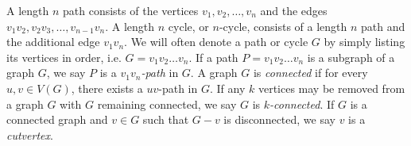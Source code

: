 \documentclass[letterpaper, 12pt]{amsart}
\theoremstyle{definition}
\theoremstyle{definition}
\theoremstyle{thm}
\theoremstyle{definition}
\begin{document}
A length $n$ path consists of the vertices $v_1,v_2,\ldots,v_n$ and the edges
$v_1v_2,v_2v_3,\ldots,v_{n-1}v_n$. A length $n$ cycle, or $n$-cycle, consists of
a length $n$ path and the additional edge $v_1v_n$. We will often denote a path
or cycle $G$ by simply listing its vertices in order, i.e. $G=v_1v_2\ldots v_n$.
If a path $P=v_1v_2\ldots v_n$ is a subgraph of a graph $G$, we say $P$ is a
\textit{$v_1v_n$-path} in $G$. A graph $G$ is \textit{connected} if for every
$u,v\in V(G)$, there exists a $uv$-path in $G$. If any $k$ vertices may be
removed from a graph $G$ with $G$ remaining connected, we say $G$ is
\textit{$k$-connected}. If $G$ is a connected graph and $v\in G$ such that $G-v$
is disconnected, we say $v$ is a \textit{cutvertex}.

\begin{comment}
\begin{figure}
\begin{tikzpicture}
	\node (a) at (0cm,0.75cm) {};
	\node (b) at (0.866cm,-0.75cm) {};
	\node (c) at (-0.866cm,-0.75cm) {};
	\node [draw=none, fill=none] (1) at (0cm,-1cm) {};
	\node [draw=none, fill=none] (2) at (0cm,1cm) {};
	\draw (a) -- (b) -- (c) -- (a);
\end{tikzpicture}
$\qquad$
\begin{tikzpicture}
	\node (a) at (0.75cm,0.75cm) {};
	\node (b) at (0.75cm,-0.75cm) {};
	\node (c) at (-0.75cm,-0.75cm) {};
	\node (d) at (-0.75cm,0.75cm) {};
	\node [draw=none, fill=none] (1) at (0cm,-1cm) {};
	\node [draw=none, fill=none] (2) at (0cm,1cm) {};
	\draw (a) -- (b) -- (c) -- (d) -- (a);
	\draw (a) -- (c); \draw (b) -- (d);
\end{tikzpicture}
$\qquad$
\begin{tikzpicture}
	\node (a) at (90:1cm) {};
	\node (b) at (162:1cm) {};
	\node (c) at (234:1cm) {};
	\node (d) at (306:1cm) {};
	\node (e) at (18:1cm) {};
	\node [draw=none, fill=none] (1) at (0cm,-1cm) {};
	\node [draw=none, fill=none] (2) at (0cm,1cm) {};
	\draw (a) -- (b); \draw (a) -- (c); \draw (a) -- (d); \draw (a) -- (e);
	\draw (b) -- (c); \draw (b) -- (d); \draw (b) -- (e); \draw (c) -- (d);
	\draw (c) -- (e); \draw (d) -- (e);
\end{tikzpicture}
$\qquad$
\begin{tikzpicture}
	\node (a) at (0.25cm,1cm) {};
	\node (b) at (-0.25cm,0.25cm) {};
	\node (c) at (0.25cm,-0.25cm) {};
	\node (d) at (-0.25cm,-1cm) {};
	\draw (a) -- (b) -- (c) -- (d);
\end{tikzpicture}
$\qquad$
\begin{tikzpicture}
	\node (a) at (180:1cm) {};
	\node (b) at (120:1cm) {};
	\node (c) at (60:1cm) {};
	\node (d) at (0:1cm) {};
	\node (e) at (300:1cm) {};
	\node (f) at (240:1cm) {};
	\node [draw=none, fill=none] (1) at (0cm,-1cm) {};
	\node [draw=none, fill=none] (2) at (0cm,1cm) {};
	\draw (a) -- (b) -- (c) -- (d) -- (e) -- (f) -- (a);
\end{tikzpicture}

\caption{Drawings of $K_3$, $K_4$, $K_5$, a length $4$ path, and a
	$5$-cycle.}
\end{figure}
\end{comment}
\end{document}
